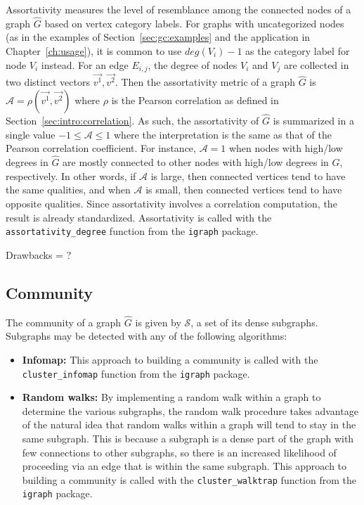 Assortativity measures the level of resemblance among the connected nodes of a 
graph $\hat{G}$ based on vertex category labels. For graphs with uncategorized 
nodes (as in the examples of Section~\ref{sec:gc:examples} and the application 
in Chapter~\ref{ch:usage}), it is common to use $deg(V_i)-1$
as the category label for node $V_i$ instead. For 
an edge $E_{i,j}$, the degree of nodes $V_i$ and $V_j$ are collected in two 
distinct vectors $\overrightarrow{v^1}, \overrightarrow{v^2}$. Then the 
assortativity metric of a graph $\hat{G}$ is $\mathcal{A} = 
\rho(\overrightarrow{v^1},\overrightarrow{v^2})$ where $\rho$ is the Pearson 
correlation as defined in Section~\ref{sec:intro:correlation}. As such, 
the assortativity of $\hat{G}$ is summarized in a single value 
$-1 \leq \mathcal{A} \leq 1$ where the interpretation is the same as that of 
the Pearson correlation coefficient. For instance, $\mathcal{A}=1$ when nodes 
with high/low degrees in $\hat{G}$ are mostly connected to other nodes with 
high/low degrees in $\hat{G}$, respectively. In other words, if 
$\mathcal{A}$ is large, then connected vertices tend to have the same 
qualities, and when $\mathcal{A}$ is small, then connected vertices tend to 
have opposite qualities. Since assortativity involves a correlation 
computation, the result is already standardized.
Assortativity is called with the \texttt{assortativity\_degree} function from 
the \texttt{igraph} package.

Drawbacks = ?

\subsection{Community}

The community of a graph $\hat{G}$ is given by $\mathcal{S}$, a set of its 
dense subgraphs. Subgraphs may be detected with any of the following algorithms:

\tablespacing
\begin{itemize}
	\item \textbf{Infomap:} 
	This approach to building a community is called with the 
	\texttt{cluster\_infomap} function from the \texttt{igraph} package.
	\item \textbf{Random walks:} By implementing a random walk within a graph 
	to determine the various subgraphs, the random walk procedure takes 
	advantage of the natural idea that random walks within a graph will tend to 
	stay in the same subgraph. This is because a subgraph is a dense part of 
	the graph with few connections to other subgraphs, so there is an 
	increased likelihood of proceeding via an edge that is within the same 
	subgraph.
	This approach to building a community is called with the 
	\texttt{cluster\_walktrap} function from the \texttt{igraph} package.
\end{itemize}
\bodyspacing

